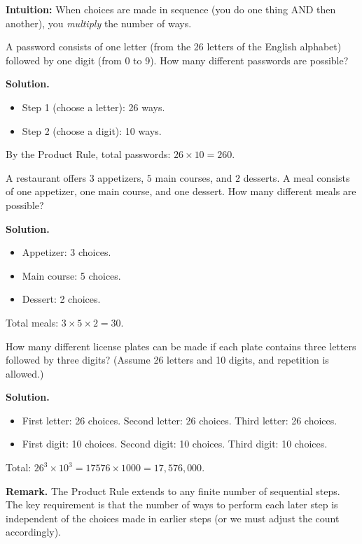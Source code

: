 \documentclass[11pt,a4paper]{article}
\begin{document}
\textbf{Intuition:} When choices are made in sequence (you do one thing AND then another), you \textit{multiply} the number of ways.

\begin{example}
A password consists of one letter (from the 26 letters of the English alphabet) followed by one digit (from 0 to 9). How many different passwords are possible?

\textbf{Solution.}
\begin{itemize}[label=--]
    \item Step 1 (choose a letter): 26 ways.
    \item Step 2 (choose a digit): 10 ways.
\end{itemize}
By the Product Rule, total passwords: $26 \times 10 = 260$.
\end{example}

\begin{example}
A restaurant offers $3$ appetizers, $5$ main courses, and $2$ desserts. A meal consists of one appetizer, one main course, and one dessert. How many different meals are possible?

\textbf{Solution.}
\begin{itemize}[label=--]
    \item Appetizer: 3 choices.
    \item Main course: 5 choices.
    \item Dessert: 2 choices.
\end{itemize}
Total meals: $3 \times 5 \times 2 = 30$.
\end{example}

\begin{example}
How many different license plates can be made if each plate contains three letters followed by three digits? (Assume 26 letters and 10 digits, and repetition is allowed.)

\textbf{Solution.}
\begin{itemize}[label=--]
    \item First letter: 26 choices. Second letter: 26 choices. Third letter: 26 choices.
    \item First digit: 10 choices. Second digit: 10 choices. Third digit: 10 choices.
\end{itemize}
Total: $26^3 \times 10^3 = 17576 \times 1000 = 17{,}576{,}000$.
\end{example}

\textbf{Remark.} The Product Rule extends to any finite number of sequential steps. The key requirement is that the number of ways to perform each later step is independent of the choices made in earlier steps (or we must adjust the count accordingly).
\end{document}
